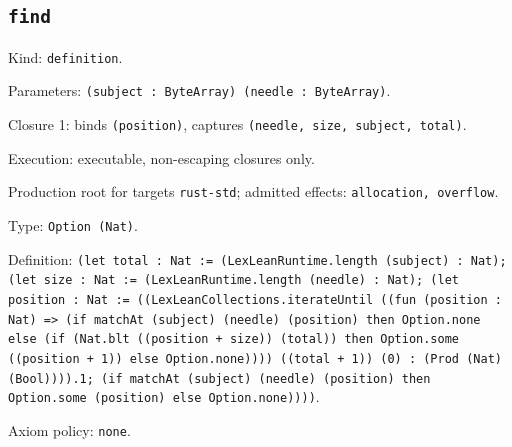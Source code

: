 \documentclass[11pt]{article}
\begin{document}
\subsection*{\texttt{find}}
\noindent Kind: \texttt{definition}.\par
\noindent Parameters: \texttt{(subject : ByteArray) (needle : ByteArray)}.\par
\noindent Closure 1: binds \texttt{(position)}, captures \texttt{(needle, size, subject, total)}.\par
\noindent Execution: executable, non-escaping closures only.\par
\noindent Production root for targets \texttt{rust-std}; admitted effects: \texttt{allocation, overflow}.\par
\noindent Type: \texttt{Option (Nat)}.\par
\noindent Definition: \texttt{(let total : Nat := (LexLeanRuntime.length (subject) : Nat); (let size : Nat := (LexLeanRuntime.length (needle) : Nat); (let position : Nat := ((LexLeanCollections.iterateUntil ((fun (position : Nat) => (if matchAt (subject) (needle) (position) then Option.none else (if (Nat.blt ((position + size)) (total)) then Option.some ((position + 1)) else Option.none)))) ((total + 1)) (0) : (Prod (Nat) (Bool)))).1; (if matchAt (subject) (needle) (position) then Option.some (position) else Option.none))))}.\par
\noindent Axiom policy: \texttt{none}.\par
\end{document}
